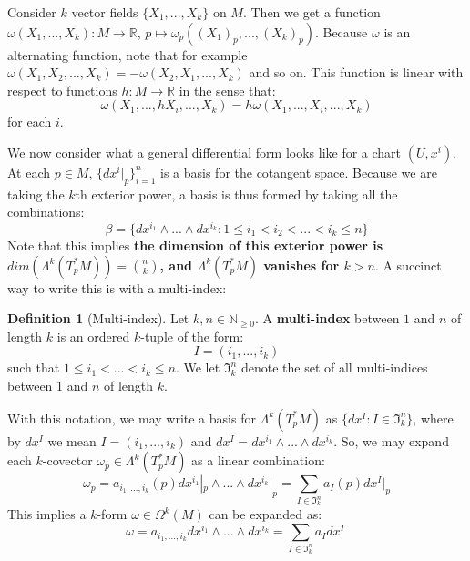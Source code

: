 \documentclass[11pt, oneside]{article}   	%
\theoremstyle{definition}
\newtheorem{definition}{Definition}[section]
\begin{document}
Consider $k$ vector fields $\{X_1, ..., X_k\}$ on $M$. Then we 
get a function $\omega(X_1, ..., X_k) : M\rightarrow\mathbb R$, $p\mapsto \omega_p((X_1)_p, ..., (X_k)_p)$. Because 
$\omega$ is an alternating function, note that for example $\omega(X_1, X_2, ..., X_k) = -\omega(X_2, X_1, ..., X_k)$ and 
so on. This function is linear with respect to functions $h : M\rightarrow\mathbb R$ in the sense that:
\begin{equation}
	\omega(X_1, ..., hX_i, ..., X_k) = h\omega(X_1, ..., X_i, ..., X_k)
\end{equation}
for each $i$. 

We now consider what a general differential form looks like for a chart $(U, x^i)$. At each $p\in M$, $\{dx^i|_p\}_{i = 1}^n$ is a 
basis for the cotangent space. Because we are taking the $k$th exterior power, a basis is thus formed by taking all the 
combinations:
\begin{equation}
	\beta = \{dx^{i_1}\wedge ...\wedge dx^{i_k} : 1\leq i_1 < i_2 < ... < i_k \leq n\}
\end{equation}
Note that this implies \textbf{the dimension of this exterior power is $dim(\Lambda^k(T_p^* M)) = {n\choose k}$, and 
$\Lambda^k(T_p^* M)$ vanishes for $k > n$}. A succinct way to write this is with a multi-index:
\begin{definition}[Multi-index]
	Let $k, n\in\mathbb N_{\geq 0}$. A \textbf{multi-index} between $1$ and $n$ of length $k$ is an ordered $k$-tuple 
	of the form:
	\begin{equation}
		I = (i_1, ..., i_k)
	\end{equation}
	such that $1\leq i_1< ...< i_k\leq n$. We let $\mathfrak I_k^n$ denote the set of all multi-indices between 1 and $n$ of 
	length $k$. 
\end{definition}
With this notation, we may write a basis for $\Lambda^k(T_p^*M)$ as $\{dx^I : I\in\mathfrak I_k^n\}$, where by $dx^I$ we 
mean $I = (i_1, ..., i_k)$ and $dx^I = dx^{i_1}\wedge ...\wedge dx^{i_k}$. So, we may expand each $k$-covector $\omega_p
\in\Lambda^k(T_p^* M)$ as a linear combination:
\begin{equation}
	\omega_p = a_{i_1, ..., i_k}(p)dx^{i_1}|_p\wedge ...\wedge dx^{i_k}|_p = \sum_{I\in\mathfrak I_k^n} a_I(p) dx^I|_p
\end{equation}
This implies a $k$-form $\omega\in\Omega^k(M)$ can be expanded as:
\begin{equation}
	\omega = a_{i_1, ..., i_k}dx^{i_1}\wedge ...\wedge dx^{i_k} = \sum_{I\in\mathfrak I_k^n} a_I dx^I~
	\label{eq:k_form}
\end{equation}
\end{document}
